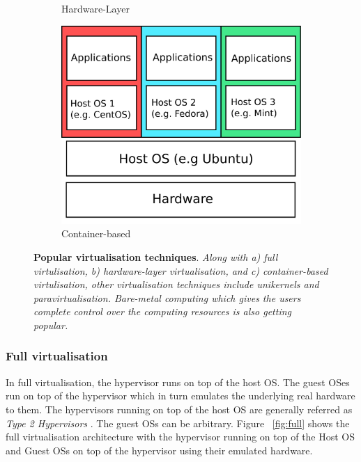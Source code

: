 \begin{figure}[t]
\begin{subfigure}[b]{0.32\textwidth}
  \caption{Hardware-Layer }
  \label{fig:hardware}
   \end{subfigure} 
   \hfill
    \begin{subfigure}[b]{0.32\textwidth}  
   \centering
  \includegraphics[width=\textwidth, keepaspectratio]{containers.png}%
  \caption{Container-based}
  \label{fig:container}
\end{subfigure}
\caption{{\bf Popular virtualisation techniques}. {\sl Along with a) full virtulisation, b) hardware-layer virtualisation, and c) container-based virtulisation, other virtualisation techniques include unikernels and paravirtualisation. Bare-metal computing which gives the users complete control over the computing resources is also getting popular.}}
\label{fig:virtualisationtechs}
\end{figure}

\subsubsection{Full virtualisation}

In full virtualisation, the hypervisor runs on top of the host OS. The guest OSes run on top of the hypervisor which in turn emulates the underlying real hardware to them. The hypervisors running on top of the host OS are generally referred as \textit{Type 2 Hypervisors} \cite{eder2016hypervisor}. The guest OSs can be arbitrary. Figure ~\ref{fig:full} shows the full virtualisation architecture with the hypervisor running on top of the Host OS and Guest OSs on top of the hypervisor using their emulated hardware. 




